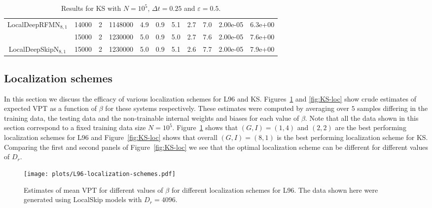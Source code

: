 \begin{table}[!htp]
\begin{tabular}{|c|c|c|c|c|c|c|c|c|c|c|}
\hline\hline
\multirow{2}{*}{LocalDeepRFMN$_{8,1}$} & 14000 & 2 & 1148000 & 4.9 & 0.9 & 5.1 & 2.7 & 7.0 & 2.00e-05 & 6.3e+00\\ \cline{2-11}
 & \cellcolor{pink}15000 & \cellcolor{pink}2 & \cellcolor{pink}1230000 & \cellcolor{pink}5.0 & \cellcolor{pink}0.9 & \cellcolor{pink}5.0 & \cellcolor{pink}2.7 & \cellcolor{pink}7.6 & \cellcolor{pink}2.00e-05 & \cellcolor{pink}7.6e+00\\ \cline{2-11}
\hline\hline
\multirow{1}{*}{LocalDeepSkipN$_{8,1}$} & \cellcolor{pink}15000 & \cellcolor{pink}2 & \cellcolor{pink}1230000 & \cellcolor{pink}5.0 & \cellcolor{pink}0.9 & \cellcolor{pink}5.1 & \cellcolor{pink}2.6 & \cellcolor{pink}7.7 & \cellcolor{pink}2.00e-05 & \cellcolor{pink}7.9e+00\\ \cline{2-11}
\hline\hline
\end{tabular}
    \caption{Results for KS with $N=10^5$, $\Delta t=0.25$ and $\varepsilon=0.5$.}
    \label{tab:KS_1}
\end{table}

\subsection{Localization schemes}
\label{ssec:loc}

In this section we discuss the efficacy of various localization schemes for L96 and KS. Figures~\ref{fig:L96-loc} and \ref{fig:KS-loc} show crude estimates of expected VPT as a function of $\beta$ for these systems respectively. These estimates were computed by averaging over $5$ samples differing in the training data, the testing data and the non-trainable internal weights and biases for each value of $\beta$. Note that all the data shown in this section correspond to a fixed training data size $N=10^5$. Figure~\ref{fig:L96-loc} shows that $(G, I)=(1, 4)$ and $(2, 2)$ are the best performing localization schemes for L96 and Figure~\ref{fig:KS-loc} shows that overall $(G, I)=(8, 1)$ is the best performing localization scheme for KS. Comparing the first and second panels of Figure~\ref{fig:KS-loc} we see that the optimal localization scheme can be different for different values of $D_r$.

\begin{figure}[!htp]
    \centering
    \texttt{[image: plots/L96-localization-schemes.pdf]}
    \caption{Estimates of mean VPT for different values of $\beta$ for different localization schemes for L96. The data shown here were generated using LocalSkip models with $D_r=4096$.}
    \label{fig:L96-loc}
\end{figure}

